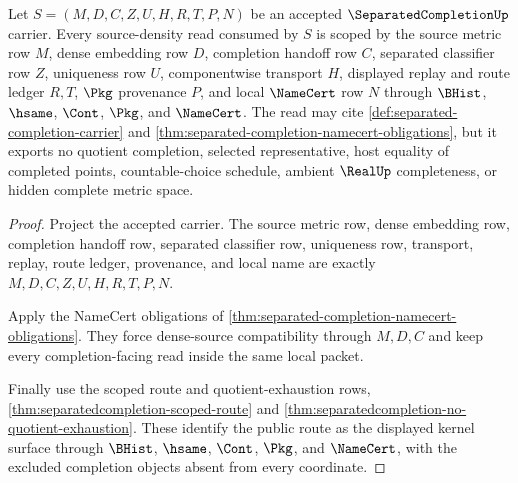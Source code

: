 \begin{theorem}
\label{thm:separated-completion-source-density-scope}
Let $S=(M,D,C,Z,U,H,R,T,P,N)$ be an accepted $\SeparatedCompletionUp$ carrier. Every source-density read consumed by $S$ is scoped by the source metric row $M$, dense embedding row $D$, completion handoff row $C$, separated classifier row $Z$, uniqueness row $U$, componentwise transport $H$, displayed replay and route ledger $R,T$, $\Pkg$ provenance $P$, and local $\NameCert$ row $N$ through $\BHist$, $\hsame$, $\Cont$, $\Pkg$, and $\NameCert$. The read may cite \autoref{def:separated-completion-carrier} and \autoref{thm:separated-completion-namecert-obligations}, but it exports no quotient completion, selected representative, host equality of completed points, countable-choice schedule, ambient $\RealUp$ completeness, or hidden complete metric space.
\end{theorem}
\begin{proof}
Project the accepted carrier. The source metric row, dense embedding row, completion handoff row, separated classifier row, uniqueness row, transport, replay, route ledger, provenance, and local name are exactly $M,D,C,Z,U,H,R,T,P,N$.

Apply the NameCert obligations of \autoref{thm:separated-completion-namecert-obligations}. They force dense-source compatibility through $M,D,C$ and keep every completion-facing read inside the same local packet.

Finally use the scoped route and quotient-exhaustion rows, \autoref{thm:separatedcompletion-scoped-route} and \autoref{thm:separatedcompletion-no-quotient-exhaustion}. These identify the public route as the displayed kernel surface through $\BHist$, $\hsame$, $\Cont$, $\Pkg$, and $\NameCert$, with the excluded completion objects absent from every coordinate.
\end{proof}

